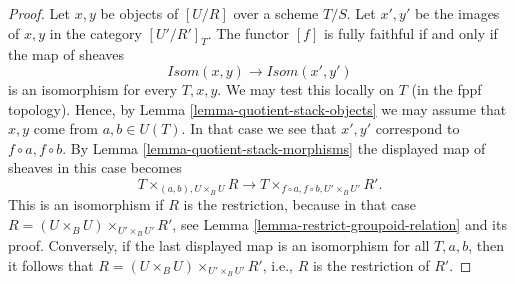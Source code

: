 \documentclass[10pt,a4paper]{amsart}
\theoremstyle{plain}
\theoremstyle{definition}
\theoremstyle{remark}
\numberwithin{equation}{subsection}
\begin{document}
\begin{proof}
Let $x, y$ be objects of $[U/R]$ over a scheme $T/S$.
Let $x', y'$ be the images of $x, y$ in the category $[U'/R']_T$.
The functor $[f]$ is fully faithful if and only if the map of sheaves
$$
\mathit{Isom}(x, y) \longrightarrow \mathit{Isom}(x', y')
$$
is an isomorphism for every $T, x, y$. We may test this locally on $T$
(in the fppf topology). Hence, by
Lemma \ref{lemma-quotient-stack-objects}
we may assume that $x, y$ come from $a, b \in U(T)$.
In that case we see that $x', y'$ correspond to $f \circ a, f \circ b$. By
Lemma \ref{lemma-quotient-stack-morphisms}
the displayed map of sheaves in this case becomes
$$
T \times_{(a, b), U \times_B U} R
\longrightarrow
T \times_{f \circ a, f \circ b, U' \times_B U'} R'.
$$
This is an isomorphism if $R$ is the restriction, because in that case
$R = (U \times_B U) \times_{U' \times_B U'} R'$, see
Lemma \ref{lemma-restrict-groupoid-relation}
and its proof. Conversely, if the last displayed map is an isomorphism
for all $T, a, b$, then it follows that
$R = (U \times_B U) \times_{U' \times_B U'} R'$, i.e.,
$R$ is the restriction of $R'$.
\end{proof}
\end{document}
